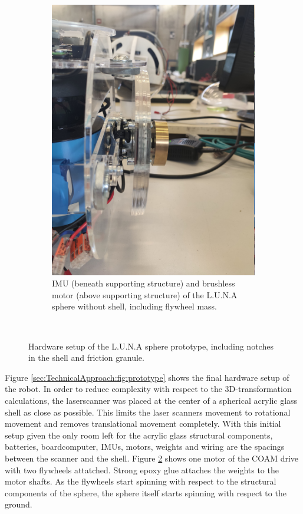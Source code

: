 \begin{figure}
\begin{subfigure}[b]{0.34\textwidth}
        \includegraphics[width=\textwidth]{../Media/sphere_right_motor.jpg}
        \caption{IMU (beneath supporting structure) and brushless motor (above supporting structure) of the L.U.N.A sphere without shell, including flywheel mass. }
        \label{sec:TechnicalApproach:fig:motor}
\end{subfigure}
\\
\caption{Hardware setup of the L.U.N.A sphere prototype, including notches in the shell and friction granule.}
\end{figure}

Figure \ref{sec:TechnicalApproach:fig:prototype} shows the final hardware setup of the robot. In order to reduce complexity with respect to the 3D-transformation calculations, the laserscanner was placed at the center of a spherical acrylic glass shell as close as possible. This limits the laser scanners movement to rotational movement and removes translational movement completely. With this initial setup given the only room left for the acrylic glass structural components, batteries, boardcomputer, IMUs, motors, weights and wiring are the spacings between the scanner and the shell. Figure \ref{sec:TechnicalApproach:fig:motor} shows one 
motor of the COAM drive with two flywheels attatched. Strong epoxy glue attaches the weights to the motor shafts. As the flywheels start spinning with respect to the structural components of the sphere, the sphere itself starts spinning with respect to the ground. 


